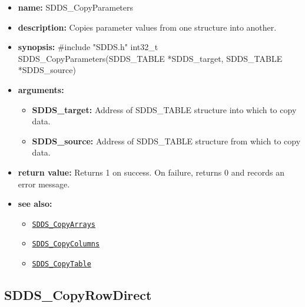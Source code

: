 \documentclass[11pt]{article}
\newcommand{\progref}[1]{\hyperref[SDDS_#1]{\tt SDDS\_#1}}
\begin{document}
\begin{itemize}
\item {\bf name:}\newline
SDDS\_CopyParameters
\item {\bf description:}\newline
Copies parameter values from one structure into another.
\item {\bf synopsis:} \#include "SDDS.h"\newline
int32\_t SDDS\_CopyParameters(SDDS\_TABLE *SDDS\_target, SDDS\_TABLE *SDDS\_source)
\item {\bf arguments:}
\begin{itemize}
\item {\bf SDDS\_target:} Address of SDDS\_TABLE structure into which to copy data.
\item {\bf SDDS\_source:} Address of SDDS\_TABLE structure from which to copy data.
\end{itemize}
\item {\bf return value:}\newline
Returns 1 on success. On failure, returns 0 and records an error message.
\item {\bf see also:}
\begin{itemize}
\item \progref{CopyArrays}
\item \progref{CopyColumns}
\item \progref{CopyTable}
\end{itemize}
\end{itemize}

\subsection{SDDS\_CopyRowDirect}
\label{SDDS_CopyRowDirect}
\end{document}
